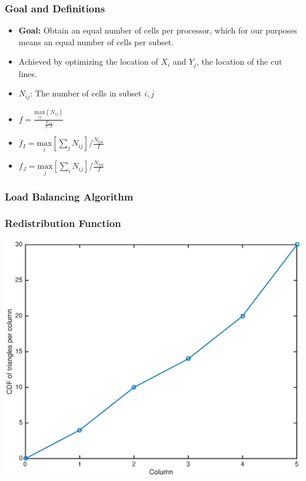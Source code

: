 \documentclass[]{beamer}
\begin{document}
\begin{frame}[t]\frametitle{ Goal and Definitions}
	\begin{block}{}
	
		\begin{itemize}
			\item \textbf{Goal:} Obtain an equal number of cells per processor, which for our purposes means an equal number of cells per subset.
			\item Achieved by optimizing the location of $X_i$ and $Y_j$, the location of the cut lines.
			\item $N_{ij}$: The number of cells  in subset ${i,j}$
			\item $f =\frac{\underset{ij}{\text{max}}(N_{ij})}{\frac{N_{tot}}{I\cdot J}}$
			\item $f_I = \underset{i}{\text{max}}[\sum_{j} N_{ij}]/\frac{N_{tot}}{I}$
			\item $f_J = \underset{j}{\text{max}}[\sum_{i} N_{ij}]/\frac{N_{tot}}{J}$
		\end{itemize}
	\end{block}
\end{frame}

\begin{frame}[t]\frametitle{Load Balancing Algorithm}
\vspace{-0.5 cm}
\begin{block}{}

\end{block}
\end{frame}

\begin{frame}[t]\frametitle{Redistribution Function}
\centering
\includegraphics[scale = 0.5]{figures/before_redistribute.eps}
\end{frame}
\end{document}
